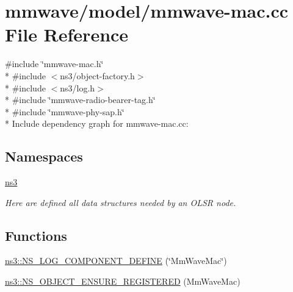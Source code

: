 \hypertarget{mmwave-mac_8cc}{}\section{mmwave/model/mmwave-\/mac.cc File Reference}
\label{mmwave-mac_8cc}
{\ttfamily \#include \char`\"{}mmwave-\/mac.\+h\char`\"{}}\\*
{\ttfamily \#include $<$ns3/object-\/factory.\+h$>$}\\*
{\ttfamily \#include $<$ns3/log.\+h$>$}\\*
{\ttfamily \#include \char`\"{}mmwave-\/radio-\/bearer-\/tag.\+h\char`\"{}}\\*
{\ttfamily \#include \char`\"{}mmwave-\/phy-\/sap.\+h\char`\"{}}\\*
Include dependency graph for mmwave-\/mac.cc\+:
\subsection*{Namespaces}
\begin{DoxyCompactItemize}
\item 
 \hyperlink{namespacens3}{ns3}
\begin{DoxyCompactList}\small\item\em Here are defined all data structures needed by an O\+L\+SR node. \end{DoxyCompactList}\end{DoxyCompactItemize}
\subsection*{Functions}
\begin{DoxyCompactItemize}
\item 
\hyperlink{namespacens3_a8d4c8b90728b3cd1269187c611380af2}{ns3\+::\+N\+S\+\_\+\+L\+O\+G\+\_\+\+C\+O\+M\+P\+O\+N\+E\+N\+T\+\_\+\+D\+E\+F\+I\+NE} (\char`\"{}Mm\+Wave\+Mac\char`\"{})
\item 
\hyperlink{namespacens3_aa91d74fb9b0aa4911b08ea4f3d020a6d}{ns3\+::\+N\+S\+\_\+\+O\+B\+J\+E\+C\+T\+\_\+\+E\+N\+S\+U\+R\+E\+\_\+\+R\+E\+G\+I\+S\+T\+E\+R\+ED} (Mm\+Wave\+Mac)
\end{DoxyCompactItemize}

